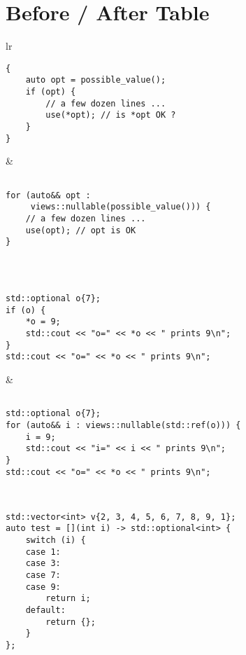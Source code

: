 \documentclass[a4paper,10pt,oneside,openany,final,article]{memoir}
\begin{document}
\chapter{Before / After Table}
\begin{tabular}{ lr }
\begin{minipage}[t]{0.45\columnwidth}
  \begin{verbatim}
{
    auto opt = possible_value();
    if (opt) {
        // a few dozen lines ...
        use(*opt); // is *opt OK ?
    }
}

\end{verbatim}
\end{minipage}
&
\begin{minipage}[t]{0.45\columnwidth}
\begin{verbatim}

for (auto&& opt :
     views::nullable(possible_value())) {
    // a few dozen lines ...
    use(opt); // opt is OK
}

\end{verbatim}
\end{minipage}
\\ \midrule
\begin{minipage}[t]{0.45\columnwidth}
  \begin{verbatim}

std::optional o{7};
if (o) {
    *o = 9;
    std::cout << "o=" << *o << " prints 9\n";
}
std::cout << "o=" << *o << " prints 9\n";

\end{verbatim}
\end{minipage}
&
\begin{minipage}[t]{0.45\columnwidth}
\begin{verbatim}

std::optional o{7};
for (auto&& i : views::nullable(std::ref(o))) {
    i = 9;
    std::cout << "i=" << i << " prints 9\n";
}
std::cout << "o=" << *o << " prints 9\n";

\end{verbatim}
\end{minipage}
\\ \midrule
\begin{minipage}[t]{0.45\columnwidth}
\begin{verbatim}
std::vector<int> v{2, 3, 4, 5, 6, 7, 8, 9, 1};
auto test = [](int i) -> std::optional<int> {
    switch (i) {
    case 1:
    case 3:
    case 7:
    case 9:
        return i;
    default:
        return {};
    }
};


\end{verbatim}
\end{minipage}
\end{tabular}
\end{document}
